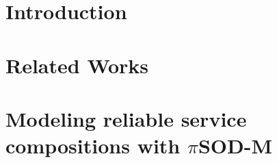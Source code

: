 \documentclass[preprint,12pt]{elsarticle}
\theoremstyle{plain}
\theoremstyle{plain}
\theoremstyle{plain}
\theoremstyle{plain}
\newcommand{\pisodm}[0]{$\pi$SOD-M\xspace}
\begin{document}

\section{Introduction}
\label{sec:intro}


\section{Related Works}
\label{sec:relworks}


%

%

%

\section{Modeling reliable service compositions with \pisodm}\label{sec:motivation}



\end{document}
